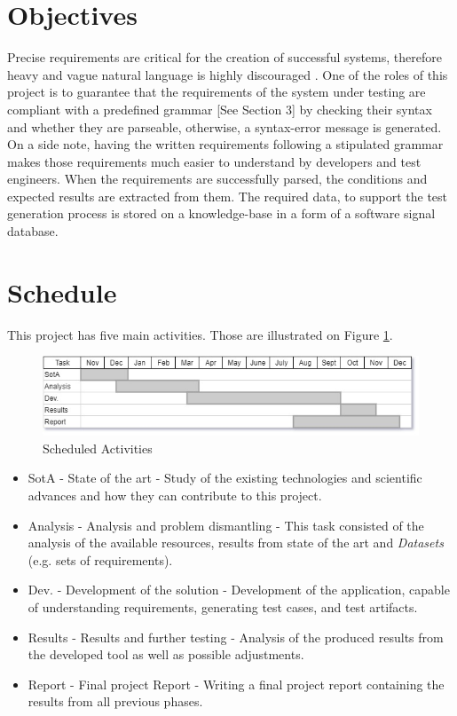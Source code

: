\section{Objectives}
\label{sec:objectives}
Precise requirements are critical for the creation of successful systems, therefore heavy and vague natural language is highly discouraged \cite{incose}.
One of the roles of this project is to guarantee that the requirements of the system under testing are compliant with a predefined grammar [See Section 3] by checking their syntax and whether they are parseable, otherwise, a syntax-error message is generated. On a side note, having the written requirements following a stipulated grammar makes those requirements much easier to understand by developers and test engineers.
When the requirements are successfully parsed, the conditions and expected results are extracted from them. The required data, to support the test generation process is stored on a knowledge-base in a form of a software signal database.


\section{Schedule}
\label{sec:schedule}
This project has five main activities. Those are illustrated on Figure \ref{fig:schedule}.

\begin{figure}[h]
    \centering
    \includegraphics[width=\textwidth]{images/gantt.jpg}
    \caption{Scheduled Activities}
    \label{fig:schedule}
\end{figure}

\begin{itemize}
    \item SotA - State of the art - Study of the existing technologies and scientific advances and how they can contribute to this project.
    \item Analysis - Analysis and problem dismantling - This task consisted of the analysis of the available resources, results from state of the art and \textit{Datasets} (e.g. sets of requirements).
    \item Dev. - Development of the solution - Development of the application, capable of understanding requirements, generating test cases, and test artifacts.
    \item Results - Results and further testing - Analysis of the produced results from the developed tool as well as possible adjustments.
    \item Report - Final project Report - Writing a final project report containing the results from all previous phases.
\end{itemize}

